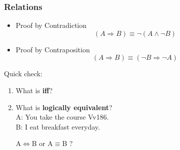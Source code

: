 \documentclass{beamer}
\begin{document}
\begin{frame}
    \frametitle{Relations}
    \begin{itemize}
        \item Proof by Contradiction
        \begin{equation*}
            (A \Rightarrow B) \equiv \neg (A \wedge \neg B)
        \end{equation*}
        \item Proof by Contraposition 
        \begin{equation*}
            (A\Rightarrow B) \equiv (\neg B \Rightarrow \neg A)
        \end{equation*}
    \end{itemize}
    \begin{block}{
    Quick check:}
    \begin{enumerate}
        \item What is \textbf{iff}?
        \item What is \textbf{logically equivalent}? \\
            A: You take the course Vv186. \\
            B: I eat breakfast everyday. \\
            \begin{center}
                A$\Leftrightarrow$B or A$\equiv$B ?        
            \end{center}
    \end{enumerate}
    \end{block}
\end{frame}
\end{document}
